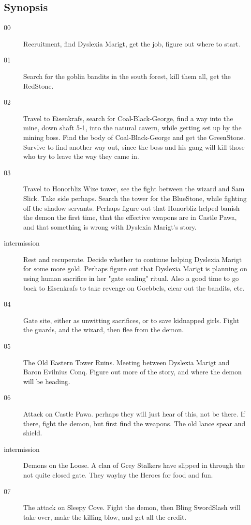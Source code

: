 \subsection*{Synopsis}
\begin{description}

\item[00] Recruitment, find Dyslexia Marigt, get the job, figure out where to start.


\item[01] Search for the goblin bandits in the south forest, kill them all, get the RedStone.


\item[02] Travel to Eisenkrafs, search for Coal-Black-George, find a way into the mine, down shaft 5-1, into the natural cavern, while getting set up by the mining boss. Find the body of Coal-Black-George and get the GreenStone. Survive to find another way out, since the boss and his gang will kill those who try to leave the way they came in.


\item[03] Travel to Honorbliz Wize tower, see the fight between the wizard and Sam Slick. Take side perhaps. Search the tower for the BlueStone, while fighting off the shadow servants. Perhaps figure out that Honorbliz helped banish the demon the first time, that the effective weapons are in Castle Pawa, and that something is wrong with Dyslexia Marigt's story.


\item[intermission] Rest and recuperate. Decide whether to continue helping Dyslexia Marigt for some more gold. Perhaps figure out that Dyslexia Marigt is planning on using human sacrifice in her "gate sealing" ritual. Also a good time to go back to Eisenkrafs to take revenge on Goebbels, clear out the bandits, etc.


\item[04] Gate site, either as unwitting sacrifices, or to save kidnapped girls. Fight the guards, and the wizard, then flee from the demon.


\item[05] The Old Eastern Tower Ruins. Meeting between Dyslexia Marigt and Baron Evilnius Conq. Figure out more of the story, and where the demon will be heading.


\item[06] Attack on Castle Pawa. perhaps they will just hear of this, not be there. If there, fight the demon, but first find the weapons. The old lance spear and shield.


\item[intermission] Demons on the Loose. A clan of Grey Stalkers have slipped in through the not quite closed gate. They waylay the Heroes for food and fun.


\item[07] The attack on Sleepy Cove. Fight the demon, then Bling SwordSlash will take over, make the killing blow, and get all the credit.

\end{description}



